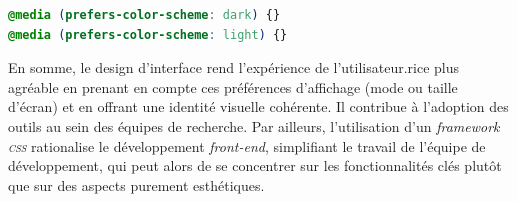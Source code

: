 \begin{lstlisting}[language=css, frame=single, breaklines=true, caption={Utilisation des \emph{media queries}.}]
@media (prefers-color-scheme: dark) {}
@media (prefers-color-scheme: light) {}
\end{lstlisting}

En somme, le design d'interface rend l'expérience de l'utilisateur.rice plus
agréable en prenant en compte ces préférences d'affichage (mode ou
taille d'écran) et en offrant une identité visuelle cohérente. Il
contribue à l'adoption des outils au sein des équipes de recherche. Par
ailleurs, l'utilisation d'un \textit{framework \textsc{css}} rationalise le développement
\textit{front-end}, simplifiant le travail de l'équipe de développement, qui
peut alors de se concentrer sur les fonctionnalités clés plutôt que
sur des aspects purement esthétiques.